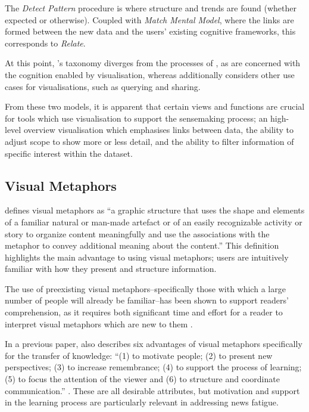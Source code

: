 The \textit{Detect Pattern} procedure is where structure and trends are found (whether expected or otherwise). Coupled with \textit{Match Mental Model}, where the links are formed between the new data and the users' existing cognitive frameworks, this corresponds to \textit{Relate}.

At this point, \citeauthor{TheEyesHaveIt}'s taxonomy diverges from the processes of \citep{UnderstandingAndCharacterizingInsights}, as \citeauthor{UnderstandingAndCharacterizingInsights} are concerned with the cognition enabled by visualisation, whereas  \citeauthor{TheEyesHaveIt} additionally considers other use cases for visualisations, such as querying and sharing.

From these two models, it is apparent that certain views and functions are crucial for tools which use visualisation to support the sensemaking process; an high-level overview visualisation which emphasises links between data, the ability to adjust scope to show more or less detail, and the ability to filter information of specific interest within the dataset.

\subsection{Visual Metaphors}

\citeauthor{AComparisonBetweenConceptMaps} defines visual metaphors as ``a graphic structure that uses the shape and elements of a familiar natural or man-made artefact or of an easily recognizable activity or story to organize content meaningfully and use the associations with the metaphor to convey additional meaning about the content.'' \citep[p.203]{AComparisonBetweenConceptMaps} This definition highlights the main advantage to using visual metaphors; users are intuitively familiar with how they present and structure information.

The use of preexisting visual metaphors--specifically those with which a large number of people will already be familiar--has been shown to support readers' comprehension, as it requires both significant time and effort for a reader to interpret visual metaphors which are new to them \citep{PreconceptionsVisualMetaphors}.

In a previous paper, \citeauthor{VisuelleKommunikation} also describes six advantages of visual metaphors specifically for the transfer of knowledge: ``(1) to motivate people; (2) to present new perspectives; (3) to increase remembrance; (4) to support the process of learning; (5) to focus the attention of the viewer and (6) to structure and coordinate communication.'' \citep[p.2, citing \citep{VisuelleKommunikation}]{LearningFromArchitects}. These are all desirable attributes, but motivation and support in the learning process are particularly relevant in addressing news fatigue.

